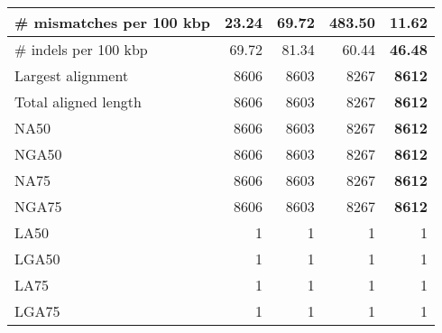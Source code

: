 \documentclass[12pt,a4paper]{article}
\begin{document}
\begin{table}[ht]
\begin{center}
\begin{tabular}{|l*{4}{|r}|}
\# mismatches per 100 kbp & 23.24 & 69.72 & 483.50 & {\bf 11.62} \\ \hline
\# indels per 100 kbp & 69.72 & 81.34 & 60.44 & {\bf 46.48} \\ \hline
Largest alignment & 8606 & 8603 & 8267 & {\bf 8612} \\ \hline
Total aligned length & 8606 & 8603 & 8267 & {\bf 8612} \\ \hline
NA50 & 8606 & 8603 & 8267 & {\bf 8612} \\ \hline
NGA50 & 8606 & 8603 & 8267 & {\bf 8612} \\ \hline
NA75 & 8606 & 8603 & 8267 & {\bf 8612} \\ \hline
NGA75 & 8606 & 8603 & 8267 & {\bf 8612} \\ \hline
LA50 & 1 & 1 & 1 & 1 \\ \hline
LGA50 & 1 & 1 & 1 & 1 \\ \hline
LA75 & 1 & 1 & 1 & 1 \\ \hline
LGA75 & 1 & 1 & 1 & 1 \\ \hline
\end{tabular}
\end{center}
\end{table}
\end{document}

